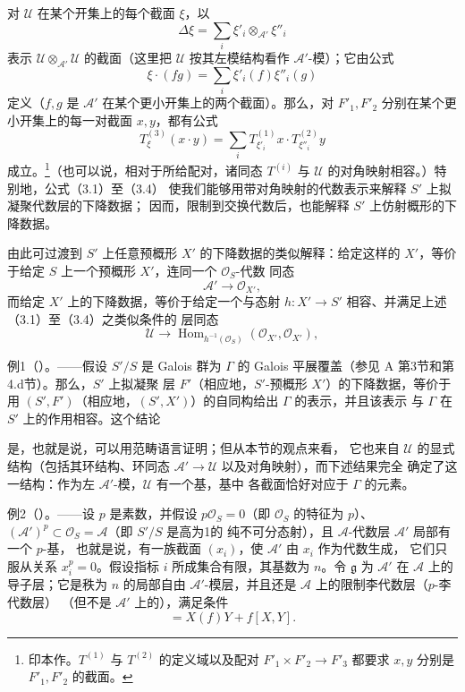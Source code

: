 对 $\mathcal U$ 在某个开集上的每个截面 $\xi$，以
\[
  \Delta\xi=\sum_i\xi'_i\otimes_{\mathcal A'}\xi''_i
\]
表示 $\mathcal U\otimes_{\mathcal A'}\mathcal U$ 的截面（这里把
$\mathcal U$ 按其左模结构看作 $\mathcal A'$-模）；它由公式
\[
  \xi\mathbin{\cdot}(fg)=\sum_i\xi'_i(f)\xi''_i(g)
\]
定义（$f,g$ 是 $\mathcal A'$ 在某个更小开集上的两个截面）。那么，对
$F'_1,F'_2$ 分别在某个更小开集上的每一对截面 $x,y$，都有公式
\begin{equation}
  T^{(3)}_\xi(x\mathbin{\cdot}y)
  =\sum_iT^{(1)}_{\xi'_i}x\mathbin{\cdot}T^{(2)}_{\xi''_i}y
  \tag{3.4}
\end{equation}
成立。\footnote{印本作。$T^{(1)}$ 与
$T^{(2)}$ 的定义域以及配对 $F'_1\times F'_2\longrightarrow F'_3$ 都要求
$x,y$ 分别是 $F'_1,F'_2$ 的截面。}（也可以说，相对于所给配对，诸同态
$T^{(i)}$ 与 $\mathcal U$ 的对角映射相容。）特别地，公式（3.1）至（3.4）
使我们能够用带对角映射的代数表示来解释 $S'$ 上拟凝聚代数层的下降数据；
因而，限制到交换代数后，也能解释 $S'$ 上仿射概形的下降数据。

由此可过渡到 $S'$ 上任意预概形 $X'$ 的下降数据的类似解释：给定这样的
$X'$，等价于给定 $S$ 上一个预概形 $X'$，连同一个 $\mathcal O_S$-代数
同态
\[
  \mathcal A'\longrightarrow\mathcal O_{X'},
\]
而给定 $X'$ 上的下降数据，等价于给定一个与态射
$h:X'\longrightarrow S'$ 相容、并满足上述（3.1）至（3.4）之类似条件的
层同态
\[
  \mathcal U\longrightarrow
  \operatorname{Hom}_{h^{-1}(\mathcal O_S)}
  (\mathcal O_{X'},\mathcal O_{X'}),
\]

\textsc{例1（）。}——假设 $S'/S$ 是 Galois 群为
$\Gamma$ 的 Galois 平展覆盖（参见 A 第3节和第4.d节）。那么，$S'$ 上拟凝聚
层 $F'$（相应地，$S'$-预概形 $X'$）的下降数据，等价于用
$(S',F')$（相应地，$(S',X')$）的自同构给出 $\Gamma$ 的表示，并且该表示
与 $\Gamma$ 在 $S'$ 上的作用相容。这个结论

是，也就是说，可以用范畴语言证明；但从本节的观点来看，
它也来自 $\mathcal U$ 的显式结构（包括其环结构、环同态
$\mathcal A'\longrightarrow\mathcal U$ 以及对角映射），而下述结果完全
确定了这一结构：作为左 $\mathcal A'$-模，$\mathcal U$ 有一个基，基中
各截面恰好对应于 $\Gamma$ 的元素。

\textsc{例2（）。}——设 $p$ 是素数，并假设
$p\mathcal O_S=0$（即 $\mathcal O_S$ 的特征为 $p$）、
$(\mathcal A')^p\subset\mathcal O_S=\mathcal A$（即 $S'/S$ 是高为1的
纯不可分态射），且 $\mathcal A$-代数层 $\mathcal A'$ 局部有一个 $p$-基，
也就是说，有一族截面 $(x_i)$，使 $\mathcal A'$ 由 $x_i$ 作为代数生成，
它们只服从关系 $x_i^p=0$。假设指标 $i$ 所成集合有限，其基数为 $n$。令
$\mathfrak g$ 为 $\mathcal A'$ 在 $\mathcal A$ 上的导子层；它是秩为 $n$
的局部自由 $\mathcal A'$-模层，并且还是 $\mathcal A$ 上的限制李代数层（$p$-李代数层）
（但不是 $\mathcal A'$ 上的），满足条件
\begin{equation}
  [X,fY]=X(f)Y+f[X,Y].
  \tag{3.5}
\end{equation}

